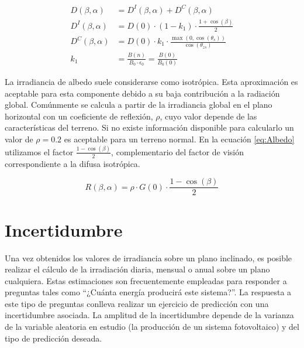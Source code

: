 \begin{align}
  D(\beta,\alpha) & =D^{I}(\beta,\alpha)+D^{C}(\beta,\alpha)\label{eq:DifusaHay}\\
  D^{I}(\beta,\alpha) & =D(0)\cdot(1-k_{1})\cdot\frac{1+\cos(\beta)}{2}\label{eq:DifusaIsotropicaHay}\\
  D^{C}(\beta,\alpha) & =D(0)\cdot k_{1}\cdot\frac{\max(0,\cos(\theta_{s}))}{\cos(\theta_{zs})}\label{eq:DifusaCircumsolar}\\
  k_{1} & =\frac{B(n)}{B_{0}\cdot\epsilon_0} = \frac{B(0)}{B_{0}(0)}\label{eq:AnisotropiaHay}
\end{align}

La irradiancia de albedo suele considerarse como isotrópica. Esta
aproximación es aceptable para esta componente debido a su baja
contribución a la radiación global. Comúnmente se calcula a partir de
la irradiancia global en el plano horizontal con un coeficiente de
reflexión, $\rho$, cuyo valor depende de las características del
terreno. Si no existe información disponible para calcularlo un valor
de $\rho=0.2$ es aceptable para un terreno
normal. En la ecuación \ref{eq:Albedo} utilizamos el factor
$\frac{1-\cos(\beta)}{2}$, complementario del factor de visión
correspondiente a la difusa isotrópica.

\begin{equation}
  R(\beta,\alpha)=\rho\cdot G(0)\cdot\frac{1-\cos(\beta)}{2}\label{eq:Albedo}\end{equation}



\section{Incertidumbre}

Una vez obtenidos los valores de irradiancia sobre un plano inclinado,
es posible realizar el cálculo de la irradiación diaria, mensual o
anual sobre un plano cualquiera. Estas estimaciones son frecuentemente
empleadas para responder a preguntas tales como {}``¿Cuánta energía
producirá este sistema?''. La respuesta a este tipo de preguntas
conlleva realizar un ejercicio de predicción con una incertidumbre
asociada. La amplitud de la incertidumbre depende de la varianza de
la variable aleatoria en estudio (la producción de un sistema fotovoltaico)
y del tipo de predicción deseada. 

